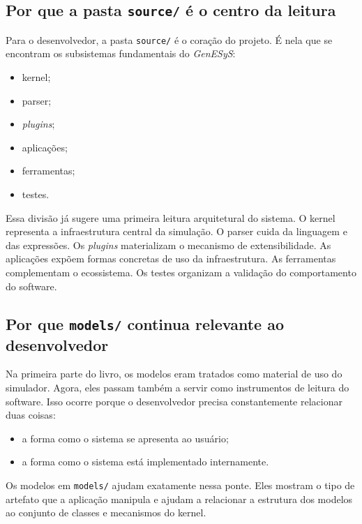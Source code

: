 \subsection{Por que a pasta \texttt{source/} é o centro da leitura}
\label{subsec:cap6_por_que_source_centro_leitura}

Para o desenvolvedor, a pasta \texttt{source/} é o coração do projeto. É nela que se encontram os subsistemas fundamentais do \textit{GenESyS}:
\begin{itemize}
    \item kernel;
    \item parser;
    \item \textit{plugins};
    \item aplicações;
    \item ferramentas;
    \item testes.
\end{itemize}

Essa divisão já sugere uma primeira leitura arquitetural do sistema. O kernel representa a infraestrutura central da simulação. O parser cuida da linguagem e das expressões. Os \textit{plugins} materializam o mecanismo de extensibilidade. As aplicações expõem formas concretas de uso da infraestrutura. As ferramentas complementam o ecossistema. Os testes organizam a validação do comportamento do software.

\subsection{Por que \texttt{models/} continua relevante ao desenvolvedor}
\label{subsec:cap6_models_relevante_ao_desenvolvedor}

Na primeira parte do livro, os modelos eram tratados como material de uso do simulador. Agora, eles passam também a servir como instrumentos de leitura do software. Isso ocorre porque o desenvolvedor precisa constantemente relacionar duas coisas:
\begin{itemize}
    \item a forma como o sistema se apresenta ao usuário;
    \item a forma como o sistema está implementado internamente.
\end{itemize}

Os modelos em \texttt{models/} ajudam exatamente nessa ponte. Eles mostram o tipo de artefato que a aplicação manipula e ajudam a relacionar a estrutura dos modelos ao conjunto de classes e mecanismos do kernel.

